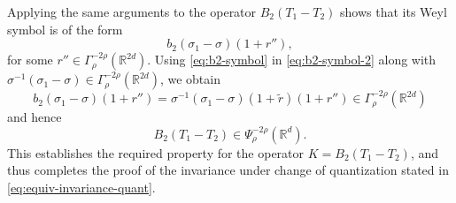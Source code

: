 \documentclass[a4paper,12pt]{article}
\newcommand{\R}{\mathbb{R}}
\begin{document}
Applying the same arguments to the operator
\(B_2(T_1-T_2)\) shows that its Weyl symbol is of the form
\begin{equation}\label{eq:b2-symbol-2}
    b_2(\sigma_1-\sigma)(1+r''),
\end{equation}
for some \(r''\in\Gamma^{-2\rho}_{\rho}(\R^{2d})\). Using \eqref{eq:b2-symbol} in \eqref{eq:b2-symbol-2} along with
\(\sigma^{-1}(\sigma_1-\sigma)\in\Gamma^{-2\rho}_{\rho}(\R^{2d})\), we obtain
\[
b_2(\sigma_1-\sigma)(1+r'')=\sigma^{-1}(\sigma_1-\sigma)(1+\tilde{r})(1+r'') 
\in \Gamma^{-2\rho}_{\rho}(\R^{2d})
\]
and hence
\[
B_2(T_1-T_2)\in\Psi^{-2\rho}_{\rho}(\R^d).
\]
This establishes the required property for the operator
\(K = B_2(T_1 - T_2)\), 
and thus completes the proof of
the invariance under change of quantization stated in \eqref{eq:equiv-invariance-quant}.
\end{document}
